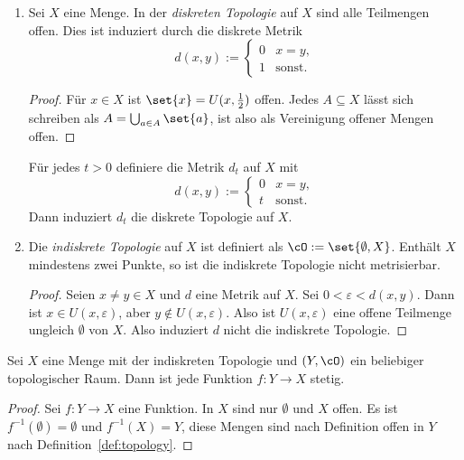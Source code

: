 \documentclass[language=ngerman]{TemplateLecture} %
\begin{document}
\begin{expl}\leavevmode\label{bsp:discrete}
    \begin{enumerate}[$(i)$]
        \item Sei $X$ eine Menge. In der \emph{diskreten Topologie} auf $X$ sind alle Teilmengen offen. Dies ist induziert durch die diskrete Metrik 
        \begin{equation*}
            d(x,y) := \begin{cases}
                0 & x = y, \\
                1 & \text{sonst.}
            \end{cases}
        \end{equation*}
        \begin{proof}
            Für $x \in X$ ist $\set{x} = U(x, \frac{1}{2})$ offen. Jedes $A \subseteq X$ lässt sich schreiben als $A = \bigcup_{a \in A} \set{a}$, ist also als Vereinigung offener Mengen offen.
        \end{proof}
        Für jedes $t > 0$ definiere die Metrik $d_t$ auf $X$ mit 
        \begin{equation*}
            d(x,y) := \begin{cases}
                0 & x = y, \\
                t & \text{sonst.}
            \end{cases}
        \end{equation*}
        Dann induziert $d_t$ die diskrete Topologie auf $X$.
        \item Die \emph{indiskrete Topologie} auf $X$ ist definiert als $\cO := \set{\emptyset, X}$. Enthält $X$ mindestens zwei Punkte, so ist die indiskrete Topologie nicht metrisierbar.
        \begin{proof}
            Seien $x \neq y \in X$ und $d$ eine Metrik auf $X$. Sei $0 < \varepsilon < d(x,y)$. Dann ist $x \in U(x,\varepsilon)$, aber $y \notin U(x, \varepsilon)$. Also ist $U(x, \varepsilon)$ eine offene Teilmenge ungleich $\emptyset$ von $X$. Also induziert $d$ nicht die indiskrete Topologie. 
        \end{proof}
    \end{enumerate}
\end{expl}

\begin{remark}
    Sei $X$ eine Menge mit der indiskreten Topologie und $(Y, \cO)$ ein beliebiger topologischer Raum. Dann ist jede Funktion $f: Y \to X$ stetig.
\end{remark}
\begin{proof}
    Sei $f: Y \to X$ eine Funktion. In $X$ sind nur $\emptyset$ und $X$ offen. Es ist $f^{-1}(\emptyset) = \emptyset$ und $f^{-1}(X) = Y$, diese Mengen sind nach Definition offen in $Y$ nach Definition~\ref{def:topology}.
\end{proof}
\end{document}
